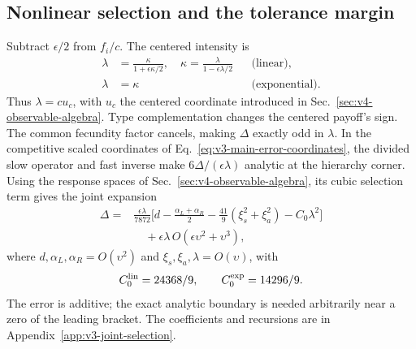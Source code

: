 \documentclass[aps,pre,reprint,amsmath,amssymb,longbibliography]{revtex4-2}
\begin{document}
\subsection{Nonlinear selection and the tolerance margin}
Subtract $\epsilon/2$ from $f_i/c$.
The centered intensity is
\begin{equation}
 \begin{aligned}
 \lambda&=\frac{\kappa}{1+\epsilon\kappa/2},\quad
 \kappa=\frac{\lambda}{1-\epsilon\lambda/2}
       &&\text{(linear)},\\
 \lambda&=\kappa&&\text{(exponential)}.
 \end{aligned}
 \label{eq:v3-main-centered-selection}
\end{equation}
Thus $\lambda=c u_c$, with $u_c$ the centered coordinate introduced
in Sec.~\ref{sec:v4-observable-algebra}.
Type complementation changes the centered payoff's sign. The common
fecundity factor cancels, making $\Delta$ exactly odd in $\lambda$.
In the competitive scaled coordinates of
Eq.~\eqref{eq:v3-main-error-coordinates}, the divided slow operator and
fast inverse make $6\Delta/(\epsilon\lambda)$ analytic at the
hierarchy corner.
Using the response spaces of Sec.~\ref{sec:v4-observable-algebra},
its cubic selection term gives the joint expansion
\begin{equation}
 \begin{aligned}
 \Delta={}&\frac{\epsilon\lambda}{7872}
 \biggl[d-\frac{\alpha_L+\alpha_R}{2}
       -\frac{41}{9}(\xi_s^2+\xi_a^2)-C_0\lambda^2\biggr]\\
 &\quad+\epsilon\lambda\,O(\epsilon\upsilon^2+\upsilon^3),
 \end{aligned}
 \label{eq:v3-main-selected-signal}
\end{equation}
where $d,\alpha_L,\alpha_R=O(\upsilon^2)$ and
$\xi_s,\xi_a,\lambda=O(\upsilon)$, with
\begin{equation}
 C_0^{\rm lin}=24368/9,\qquad C_0^{\exp}=14296/9.
 \label{eq:v3-main-selection-cost}
\end{equation}
The error is additive; the exact analytic boundary is needed arbitrarily
near a zero of the leading bracket. The coefficients and recursions are
in Appendix~\ref{app:v3-joint-selection}.
\end{document}
